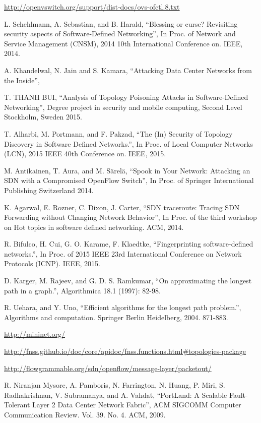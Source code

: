 \begin{thebibliography}{1}
\url{http://openvswitch.org/support/dist-docs/ovs-ofctl.8.txt}

L. Schehlmann, A. Sebastian, and B. Harald, 
``Blessing or curse? Revisiting security aspects of Software-Defined Networking'', In Proc. of Network and Service Management (CNSM), 2014 10th International Conference on. IEEE, 2014.

A. Khandelwal, N. Jain and S. Kamara,
``Attacking Data Center Networks from the Inside'', 

T. THANH BUI,
``Analysis of Topology Poisoning Attacks in Software-Defined Networking'', Degree project in security and mobile computing, Second Level Stockholm, Sweden 2015.

T. Alharbi, M. Portmann, and F. Pakzad,
``The (In) Security of Topology Discovery in Software Defined Networks.'', In Proc. of Local Computer Networks (LCN), 2015 IEEE 40th Conference on. IEEE, 2015.

M. Antikainen, T. Aura, and M. Särelä,
``Spook in Your Network: Attacking an SDN with a Compromised OpenFlow Switch'', In Proc. of Springer International Publishing Switzerland 2014.

K. Agarwal, E. Rozner, C. Dixon, J. Carter,
``SDN traceroute: Tracing SDN Forwarding without Changing Network Behavior'', In Proc. of the third workshop on Hot topics in software defined networking. ACM, 2014.

R. Bifulco, H. Cui, G. O. Karame, F. Klaedtke,
``Fingerprinting software-defined networks.'', In Proc. of 2015 IEEE 23rd International Conference on Network Protocols (ICNP). IEEE, 2015.

D. Karger, M. Rajeev, and G. D. S. Ramkumar,
``On approximating the longest path in a graph.'', Algorithmica 18.1 (1997): 82-98.

R. Uehara, and Y. Uno,
``Efficient algorithms for the longest path problem.'', Algorithms and computation. Springer Berlin Heidelberg, 2004. 871-883.

\url{http://mininet.org/}

\url{http://fnss.github.io/doc/core/apidoc/fnss.functions.html#topologies-package}

\url{http://flowgrammable.org/sdn/openflow/message-layer/packetout/}

R. Niranjan Mysore, A. Pamboris, N. Farrington, N. Huang, P. Miri, S. Radhakrishnan, V. Subramanya, and A. Vahdat,
``PortLand: A Scalable Fault-Tolerant Layer 2 Data Center Network Fabric'', ACM SIGCOMM Computer Communication Review. Vol. 39. No. 4. ACM, 2009.


\end{thebibliography}
